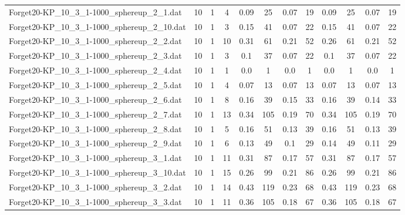 \begin{sidewaystable}[!ht]
{\begin{tabular}{lccccccccccc}
Forget20-KP\_10\_3\_1-1000\_sphereup\_2\_1.dat & 10 & 1 & 4 & 0.09 & 25 &  \textcolor{blue2}{0.07} & 19 & 0.09 & 25 &  \textcolor{blue2}{0.07} & 19 \\
Forget20-KP\_10\_3\_1-1000\_sphereup\_2\_10.dat & 10 & 1 & 3 & 0.15 & 41 &  \textcolor{blue2}{0.07} & 22 & 0.15 & 41 &  \textcolor{blue2}{0.07} & 22 \\
Forget20-KP\_10\_3\_1-1000\_sphereup\_2\_2.dat & 10 & 1 & 10 & 0.31 & 61 &  \textcolor{blue2}{0.21} & 52 & 0.26 & 61 &  \textcolor{blue2}{0.21} & 52 \\
Forget20-KP\_10\_3\_1-1000\_sphereup\_2\_3.dat & 10 & 1 & 3 & 0.1 & 37 &  \textcolor{blue2}{0.07} & 22 & 0.1 & 37 &  \textcolor{blue2}{0.07} & 22 \\
Forget20-KP\_10\_3\_1-1000\_sphereup\_2\_4.dat & 10 & 1 & 1 &  \textcolor{blue2}{0.0} & 1 &  \textcolor{blue2}{0.0} & 1 &  \textcolor{blue2}{0.0} & 1 &  \textcolor{blue2}{0.0} & 1 \\
Forget20-KP\_10\_3\_1-1000\_sphereup\_2\_5.dat & 10 & 1 & 4 &  \textcolor{blue2}{0.07} & 13 &  \textcolor{blue2}{0.07} & 13 &  \textcolor{blue2}{0.07} & 13 &  \textcolor{blue2}{0.07} & 13 \\
Forget20-KP\_10\_3\_1-1000\_sphereup\_2\_6.dat & 10 & 1 & 8 & 0.16 & 39 & 0.15 & 33 & 0.16 & 39 &  \textcolor{blue2}{0.14} & 33 \\
Forget20-KP\_10\_3\_1-1000\_sphereup\_2\_7.dat & 10 & 1 & 13 & 0.34 & 105 &  \textcolor{blue2}{0.19} & 70 & 0.34 & 105 &  \textcolor{blue2}{0.19} & 70 \\
Forget20-KP\_10\_3\_1-1000\_sphereup\_2\_8.dat & 10 & 1 & 5 & 0.16 & 51 &  \textcolor{blue2}{0.13} & 39 & 0.16 & 51 &  \textcolor{blue2}{0.13} & 39 \\
Forget20-KP\_10\_3\_1-1000\_sphereup\_2\_9.dat & 10 & 1 & 6 & 0.13 & 49 &  \textcolor{blue2}{0.1} & 29 & 0.14 & 49 & 0.11 & 29 \\
Forget20-KP\_10\_3\_1-1000\_sphereup\_3\_1.dat & 10 & 1 & 11 & 0.31 & 87 &  \textcolor{blue2}{0.17} & 57 & 0.31 & 87 &  \textcolor{blue2}{0.17} & 57 \\
Forget20-KP\_10\_3\_1-1000\_sphereup\_3\_10.dat & 10 & 1 & 15 & 0.26 & 99 &  \textcolor{blue2}{0.21} & 86 & 0.26 & 99 &  \textcolor{blue2}{0.21} & 86 \\
Forget20-KP\_10\_3\_1-1000\_sphereup\_3\_2.dat & 10 & 1 & 14 & 0.43 & 119 &  \textcolor{blue2}{0.23} & 68 & 0.43 & 119 &  \textcolor{blue2}{0.23} & 68 \\
Forget20-KP\_10\_3\_1-1000\_sphereup\_3\_3.dat & 10 & 1 & 11 & 0.36 & 105 &  \textcolor{blue2}{0.18} & 67 & 0.36 & 105 &  \textcolor{blue2}{0.18} & 67 \\

\end{tabular}}
\end{sidewaystable}

